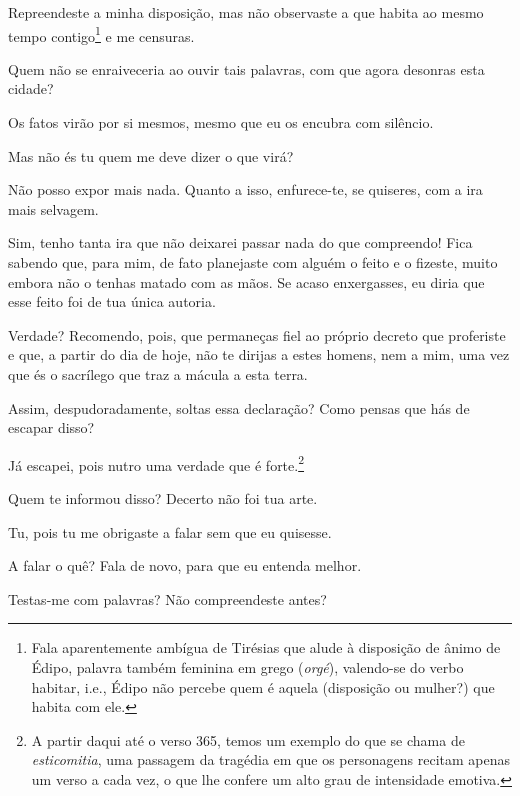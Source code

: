    Repreendeste a minha disposição, mas não observaste a que habita ao
mesmo tempo contigo\footnote{Fala aparentemente ambígua de Tirésias que
  alude à disposição de ânimo de Édipo, palavra também feminina em grego
  (\emph{orgé}), valendo-se do verbo habitar, i.e., Édipo não percebe
  quem é aquela (disposição ou mulher?) que habita com ele.} e me
censuras.


   Quem não se enraiveceria  ao ouvir tais palavras, com que agora
desonras esta cidade?

   Os fatos virão por si mesmos, mesmo que eu os encubra com silêncio.

   Mas não és tu quem me deve dizer o que virá?

   Não posso expor mais nada. Quanto a isso, enfurece-te, se quiseres, com
a ira mais selvagem.

   Sim, tenho tanta ira que não deixarei passar nada do que compreendo!
Fica sabendo que, para mim, de fato planejaste com alguém o feito e o
fizeste, muito embora não o tenhas matado com as mãos. Se acaso
enxergasses, eu diria que esse feito foi de tua única autoria.

    Verdade? Recomendo, pois, que permaneças fiel ao próprio decreto
que proferiste e que, a partir do dia de hoje, não te dirijas a estes
homens, nem a mim, uma vez que és o sacrílego que traz a mácula a esta
terra.

   Assim, despudoradamente, soltas essa declaração? Como pensas que hás de
escapar disso?

   Já escapei, pois nutro uma verdade que é forte.\footnote{A partir daqui até o verso 365, temos um
  exemplo do que se chama de \emph{esticomitia}, uma passagem da
  tragédia em que os personagens recitam apenas um verso a cada vez, o
  que lhe confere um alto grau de intensidade emotiva.}

   Quem te informou disso? Decerto não foi tua arte.



   Tu, pois tu me obrigaste a falar sem que eu quisesse.

   A falar o quê? Fala de novo, para que eu entenda melhor.

   Testas-me com palavras?  Não compreendeste antes?

